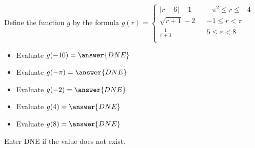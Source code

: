 \documentclass{ximera}
\begin{document}
\begin{definition}
Define the function $g$ by the formula $g(r) =   
\left \{ \begin{aligned}     
|r+6|- 1 && -\pi^2 \leq r \leq -4 \\        
\sqrt{r+1} + 2 && -1 \leq r < \pi \\      
\frac{1}{r+3} && 5 \leq r < 8\\       
\end{aligned} \right .$ 
\end{definition}






\begin{exercise}
\begin{itemize}
\item Evaluate $g(-10) = \answer{DNE}$
\item Evaluate $g(-\pi) = \answer{DNE}$
\item Evaluate $g(-2) = \answer{DNE}$
\item Evaluate $g(4) = \answer{DNE}$
\item Evaluate $g(8) = \answer{DNE}$
\end{itemize}
Enter DNE if the value does not exist.
\end{exercise}
\end{document}
